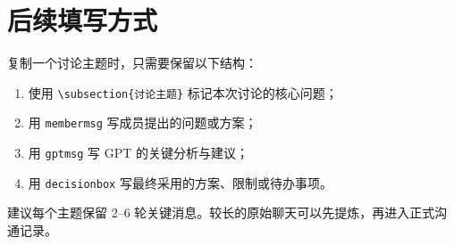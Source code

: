 \documentclass[12pt,a4paper]{ctexart}
\begin{document}
\section{后续填写方式}

复制一个讨论主题时，只需要保留以下结构：

\begin{enumerate}[label=\arabic*.]
  \item 使用 \verb|\subsection{讨论主题}| 标记本次讨论的核心问题；
  \item 用 \verb|membermsg| 写成员提出的问题或方案；
  \item 用 \verb|gptmsg| 写 GPT 的关键分析与建议；
  \item 用 \verb|decisionbox| 写最终采用的方案、限制或待办事项。
\end{enumerate}

建议每个主题保留 2--6 轮关键消息。较长的原始聊天可以先提炼，再进入正式沟通记录。
\end{document}
